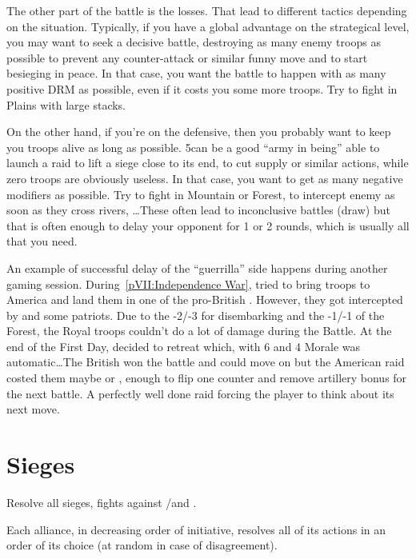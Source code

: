 \begin{playtip}[Losses]
  The other part of the battle is the losses. That lead to different tactics
  depending on the situation. Typically, if you have a global advantage on the
  strategical level, you may want to seek a decisive battle, destroying as
  many enemy troops as possible to prevent any counter-attack or similar funny
  move and to start besieging in peace. In that case, you want the battle to
  happen with as many positive DRM as possible, even if it costs you some more
  troops. Try to fight in Plains with large stacks.

  On the other hand, if you're on the defensive, then you probably want to
  keep you troops alive as long as possible. 5\LD can be a good ``army in
  being'' able to launch a raid to lift a siege close to its end, to cut
  supply or similar actions, while zero troops are obviously useless. In that
  case, you want to get as many negative modifiers as possible. Try to fight
  in Mountain or Forest, to intercept enemy as soon as they cross rivers,
  \ldots These often lead to inconclusive battles (draw) but that is often
  enough to delay your opponent for 1 or 2 rounds, which is usually all that
  you need.

  \smallskip

  An example of successful delay of the ``guerrilla'' side happens during
  another gaming session. During~\ref{pVII:Independence War}, \ANG tried to
  bring troops to America and land them in one of the pro-British
  \COL. However, they got intercepted by  and some
  patriots. Due to the -2/-3 for disembarking and the -1/-1 of the Forest, the
  Royal troops couldn't do a lot of damage during the Battle. At the end of
  the First Day,  decided to retreat which, with 6 \Man and
  4 Morale was automatic\ldots The British won the battle and could move on
  but the American raid costed them maybe \texttu or \texttd, enough to flip
  one \ARMY counter and remove artillery bonus for the next battle. A
  perfectly well done raid forcing the \ANG player to think about its next
  move.
\end{playtip}

\section{Sieges}
\label{chMilitary:Sieges}
Resolve all sieges, fights against \REVOLT/\REBELLION and \corsaire.

Each alliance, in decreasing order of initiative, resolves all of its actions
in an order of its choice (at random in case of disagreement).

